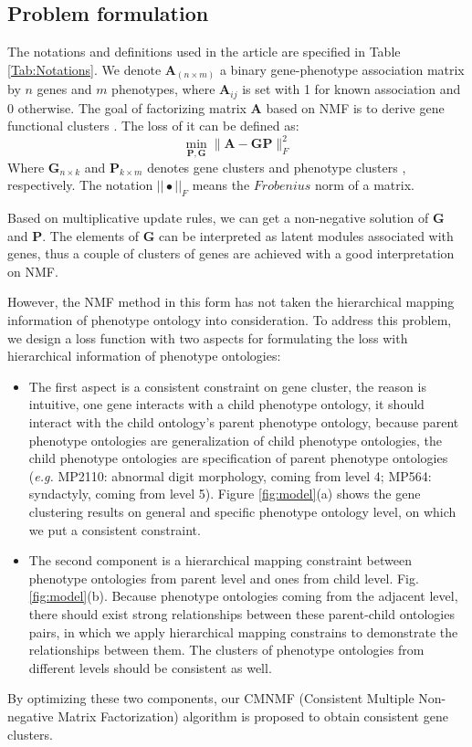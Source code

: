 \documentclass{bmcart}
\begin{document}
\subsection*{\textbf{Problem formulation}}
The notations and definitions used in the article are specified in Table \ref{Tab:Notations}.
We denote $\bm{A}_{(n \times m)}$ a binary gene-phenotype association matrix by $n$ genes and $m$ phenotypes, where $\bm{A}_{ij}$ is set with 1 for known association and 0 otherwise. The goal of factorizing matrix $\bm{A}$ based on NMF\cite{DanielD.Lee2001} is to derive gene functional clusters . The loss of it can be defined as:
\begin{equation}\label{equ:NMF}
\mathop{min}_{{\bm{P},\bm{G}}} \|\bm{A}-\bm{GP}\|^{2}_{F}
\end{equation}
Where $\bm{G}_{n\times k}$ and $\bm{P}_{k\times m}$ denotes gene clusters and phenotype clusters , respectively. The notation $||\bullet||_F$ means the $Frobenius$ norm of a matrix.

Based on multiplicative update rules\cite{DanielD.Lee2001}, we can get a non-negative solution of $\bm{G}$ and $\bm{P}$. The elements of $\bm{G}$ can be interpreted as latent modules associated with genes, thus a couple of clusters of genes are achieved with a good interpretation on NMF.

However, the NMF method in this form has not taken the hierarchical mapping information of phenotype ontology into consideration. To address this problem, we design a loss function with two aspects for formulating the loss with hierarchical information of phenotype ontologies:
\begin{itemize}
\item The first aspect is a consistent constraint on gene cluster, the reason is intuitive, one gene interacts with a child phenotype ontology, it should interact with the child ontology's parent phenotype ontology, because parent phenotype ontologies are generalization of child phenotype ontologies, the child phenotype ontologies are specification of parent phenotype ontologies (\emph{e.g.} MP2110: abnormal digit morphology, coming from level 4; MP564: syndactyly, coming from level 5). Figure \ref{fig:model}(a) shows the gene clustering results on general and specific phenotype ontology level, on which we put a consistent constraint.
\item The second component is a hierarchical mapping constraint between phenotype ontologies from parent level and ones from child level. Fig. \ref{fig:model}(b). Because phenotype ontologies coming from the adjacent level, there should exist strong relationships between these parent-child ontologies pairs, in which we apply hierarchical mapping constrains to demonstrate the relationships between them. The clusters of phenotype ontologies from different levels should be consistent as well.
\end{itemize}
By optimizing these two components, our CMNMF (Consistent Multiple Non-negative Matrix Factorization) algorithm is proposed to obtain consistent gene clusters.
\end{document}
